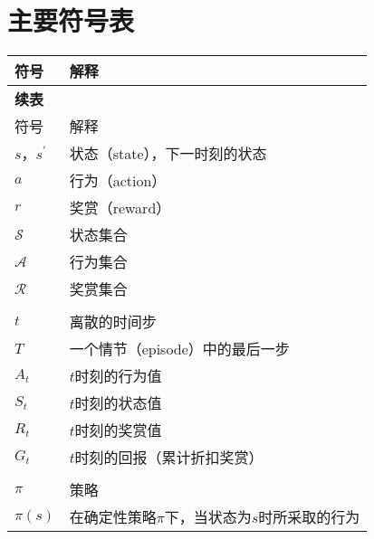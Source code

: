 \chapter{主要符号表}

\begin{longtable}{p{2cm}p{11cm}}
 \toprule
符号 & 解释 \\
 \midrule
\endfirsthead
 {\bf 续表}\\
 \toprule
符号 & 解释 \\
 \midrule
\endhead
\endfoot
 \bottomrule
\endlastfoot
$s$，$s^{'} $                  & 状态（state），下一时刻的状态           \\
$a$                            & 行为（action）                \\
$r$                           & 奖赏（reward）                  \\
$\mathcal{S}$                            & 状态集合\\
$\mathcal{A}$                            & 行为集合                             \\
$\mathcal{R}$                            & 奖赏集合                                    \\
                            &                                         \\
$t$                            & 离散的时间步                                    \\
$T$                            & 一个情节（episode）中的最后一步              \\
$A_{t}$                            & $t$时刻的行为值              \\
$S_{t}$                          & $t$时刻的状态值                    \\
$R_{t}$                           & $t$时刻的奖赏值                               \\
$G_{t}$                            & $t$时刻的回报（累计折扣奖赏）    \\
                            &                        \\
$\pi$                            & 策略                                              \\
$\pi(s)$     & 在确定性策略$\pi$下，当状态为$s$时所采取的行为                 \\

\end{longtable}
